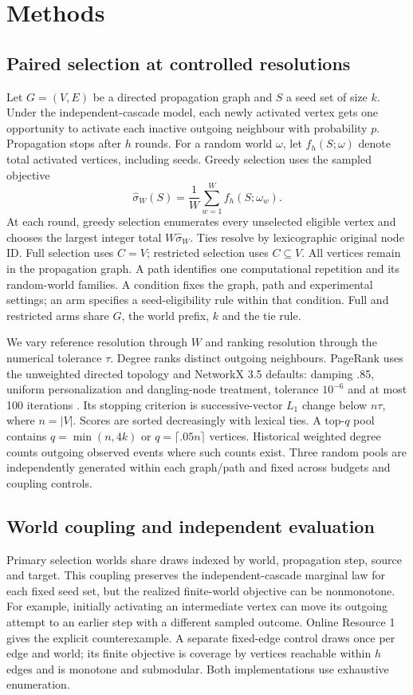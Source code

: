 \documentclass[smallextended]{svjour3}
\begin{document}
\section{Methods}
\subsection{Paired selection at controlled resolutions}
Let $G=(V,E)$ be a directed propagation graph and $S$ a seed set of size $k$. Under the independent-cascade model, each newly activated vertex gets one opportunity to activate each inactive outgoing neighbour with probability $p$. Propagation stops after $h$ rounds. For a random world $\omega$, let $f_h(S;\omega)$ denote total activated vertices, including seeds. Greedy selection uses the sampled objective
\begin{equation}
\widehat\sigma_W(S)=\frac{1}{W}\sum_{w=1}^{W}f_h(S;\omega_w).
\end{equation}
At each round, greedy selection enumerates every unselected eligible vertex and chooses the largest integer total $W\widehat\sigma_W$. Ties resolve by lexicographic original node ID. Full selection uses $C=V$; restricted selection uses $C\subseteq V$. All vertices remain in the propagation graph. A path identifies one computational repetition and its random-world families. A condition fixes the graph, path and experimental settings; an arm specifies a seed-eligibility rule within that condition. Full and restricted arms share $G$, the world prefix, $k$ and the tie rule.

We vary reference resolution through $W$ and ranking resolution through the numerical tolerance $\tau$. Degree ranks distinct outgoing neighbours. PageRank uses the unweighted directed topology and NetworkX 3.5 defaults: damping .85, uniform personalization and dangling-node treatment, tolerance $10^{-6}$ and at most 100 iterations \cite{networkxpr}. Its stopping criterion is successive-vector $L_1$ change below $n\tau$, where $n=|V|$. Scores are sorted decreasingly with lexical ties. A top-$q$ pool contains $q=\min(n,4k)$ or $q=\lceil .05n\rceil$ vertices. Historical weighted degree counts outgoing observed events where such counts exist. Three random pools are independently generated within each graph/path and fixed across budgets and coupling controls.

\subsection{World coupling and independent evaluation}\label{sec:coupling}
Primary selection worlds share draws indexed by world, propagation step, source and target. This coupling preserves the independent-cascade marginal law for each fixed seed set, but the realized finite-world objective can be nonmonotone. For example, initially activating an intermediate vertex can move its outgoing attempt to an earlier step with a different sampled outcome. Online Resource 1 gives the explicit counterexample. A separate fixed-edge control draws once per edge and world; its finite objective is coverage by vertices reachable within $h$ edges and is monotone and submodular. Both implementations use exhaustive enumeration.
\end{document}
